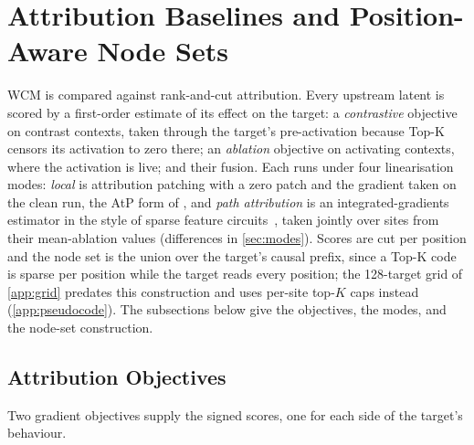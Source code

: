 \documentclass[10pt]{article}
\begin{document}
\section{Attribution Baselines and Position-Aware Node Sets}
\label{app:attribution}
\label{sec:attr-baselines}
WCM is compared against rank-and-cut attribution.
Every upstream latent is scored by a first-order estimate of its effect on the target: a \emph{contrastive} objective on contrast contexts, taken through the target's pre-activation because Top-K censors its activation to zero there; an \emph{ablation} objective on activating contexts, where the activation is live; and their fusion.
Each runs under four linearisation modes: \emph{local} is attribution patching with a zero patch and the gradient taken on the clean run, the AtP form of \citet{kramar2024atp}, and \emph{path attribution} is an integrated-gradients estimator in the style of sparse feature circuits~\citep{marks2025sparse}, taken jointly over sites from their mean-ablation values (differences in \cref{sec:modes}).
Scores are cut per position and the node set is the union over the target's causal prefix, since a Top-K code is sparse per position while the target reads every position; the 128-target grid of \cref{app:grid} predates this construction and uses per-site top-$K$ caps instead (\cref{app:pseudocode}).
The subsections below give the objectives, the modes, and the node-set construction.

\subsection{Attribution Objectives}
\label{sec:cfgrad}
\label{sec:abgrad}
\label{sec:hybrid}

Two gradient objectives supply the signed scores, one for each side of the target's behaviour.
\end{document}

